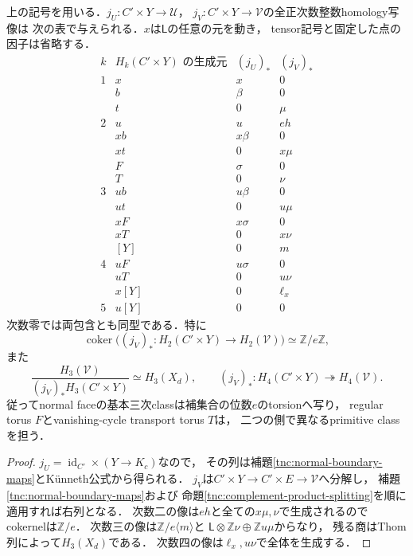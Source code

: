 \begin{theorem}[両側への全整数境界包含写像]
\label{tnc:all-boundary-homology-maps}
上の記号を用いる．$j_U:C'\times Y\to\mathcal U$，
$j_V:C'\times Y\to\mathcal V$の全正次数整数homology写像は
次の表で与えられる．$x$は$\mathsf L$の任意の元を動き，
tensor記号と固定した点の因子は省略する．
\[
\begin{array}{c|c|c|c}
 k& H_k(C'\times Y)\text{ の生成元}&(j_U)_*&(j_V)_*\\ \hline
1&x&x&0\\
 &b&\beta&0\\
 &t&0&\mu\\ \hline
2&u&u&eh\\
 &xb&x\beta&0\\
 &xt&0&x\mu\\
 &F&\sigma&0\\
 &T&0&\nu\\ \hline
3&ub&u\beta&0\\
 &ut&0&u\mu\\
 &xF&x\sigma&0\\
 &xT&0&x\nu\\
 &[Y]&0&m\\ \hline
4&uF&u\sigma&0\\
 &uT&0&u\nu\\
 &x[Y]&0&\ell_x\\ \hline
5&u[Y]&0&0
\end{array}
\]
次数零では両包含とも同型である．特に
\[
 \operatorname{coker}\bigl((j_V)_*:H_2(C'\times Y)\to H_2(\mathcal V)\bigr)
 \simeq\mathbb Z/e\mathbb Z,
\]
また
\[
 \frac{H_3(\mathcal V)}{(j_V)_*H_3(C'\times Y)}\simeq H_3(X_d),
 \qquad
 (j_V)_*:H_4(C'\times Y)\twoheadrightarrow H_4(\mathcal V).
\]
従ってnormal faceの基本三次classは補集合の位数$e$のtorsionへ写り，
regular torus $F$とvanishing-cycle transport torus $T$は，
二つの側で異なるprimitive classを担う．
\end{theorem}

\begin{proof}
$j_U=\operatorname{id}_{C'}\times(Y\to K_c)$なので，
その列は補題\ref{tnc:normal-boundary-maps}とK\"unneth公式から得られる．
$j_V$は$C'\times Y\to C'\times E\to\mathcal V$へ分解し，
補題\ref{tnc:normal-boundary-maps}および
命題\ref{tnc:complement-product-splitting}を順に適用すれば右列となる．
次数二の像は$eh$と全ての$x\mu,\nu$で生成されるのでcokernelは$\mathbb Z/e$．
次数三の像は$\mathbb Z/e\langle m\rangle$と
$\mathsf L\otimes\mathbb Z\nu\oplus\mathbb Z u\mu$からなり，
残る商はThom列によって$H_3(X_d)$である．
次数四の像は$\ell_x,u\nu$で全体を生成する．
\end{proof}

